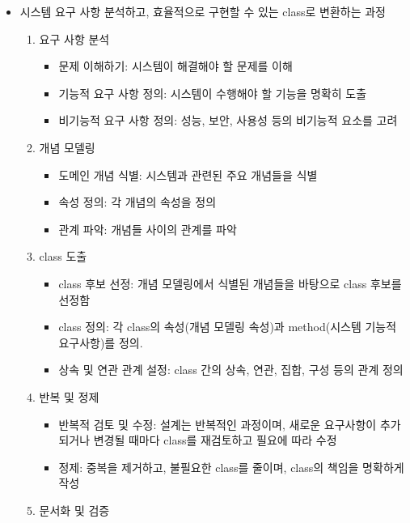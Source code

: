 \begin{itemize}
\tightlist
\item
  시스템 요구 사항 분석하고, 효율적으로 구현할 수 있는 class로 변환하는
  과정

  \begin{enumerate}
  \def\labelenumi{\arabic{enumi}.}
  \tightlist
  \item
    요구 사항 분석

    \begin{itemize}
    \tightlist
    \item
      문제 이해하기: 시스템이 해결해야 할 문제를 이해
    \item
      기능적 요구 사항 정의: 시스템이 수행해야 할 기능을 명확히 도출
    \item
      비기능적 요구 사항 정의: 성능, 보안, 사용성 등의 비기능적 요소를
      고려
    \end{itemize}
  \item
    개념 모델링

    \begin{itemize}
    \tightlist
    \item
      도메인 개념 식별: 시스템과 관련된 주요 개념들을 식별
    \item
      속성 정의: 각 개념의 속성을 정의
    \item
      관계 파악: 개념들 사이의 관계를 파악
    \end{itemize}
  \item
    class 도출

    \begin{itemize}
    \tightlist
    \item
      class 후보 선정: 개념 모델링에서 식별된 개념들을 바탕으로 class
      후보를 선정함
    \item
      class 정의: 각 class의 속성(개념 모델링 속성)과 method(시스템
      기능적 요구사항)를 정의.
    \item
      상속 및 연관 관계 설정: class 간의 상속, 연관, 집합, 구성 등의
      관계 정의
    \end{itemize}
  \item
    반복 및 정제

    \begin{itemize}
    \tightlist
    \item
      반복적 검토 및 수정: 설계는 반복적인 과정이며, 새로운 요구사항이
      추가되거나 변경될 때마다 class를 재검토하고 필요에 따라 수정
    \item
      정제: 중복을 제거하고, 불필요한 class를 줄이며, class의 책임을
      명확하게 작성
    \end{itemize}
  \item
    문서화 및 검증


\end{enumerate}
\end{itemize}
